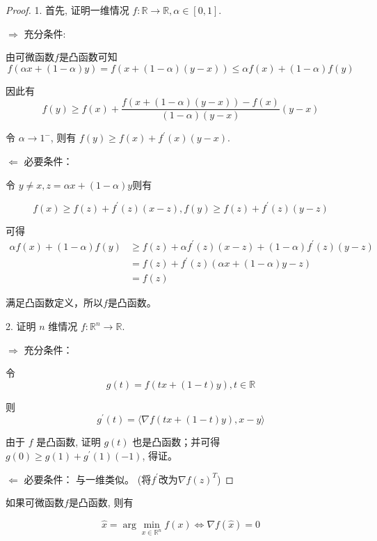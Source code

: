 \begin{proof}
    1. 首先, 证明一维情况 $ f: \mathbb{R} \rightarrow \mathbb{R}, \alpha \in[0,1] $.

    $ \Rightarrow  $ 充分条件: 
    
    由可微函数$f$是凸函数可知
    $$ f(\alpha x+(1-\alpha) y)=f(x+(1-\alpha)(y-x)) \leq \alpha f(x)+(1-\alpha) f(y) $$
    
    因此有
    $$ f(y) \geq f(x)+\frac{f(x+(1-\alpha)(y-x))-f(x)}{(1-\alpha)(y-x)}(y-x) $$

    令 $ \alpha \rightarrow 1^- $, 则有 $ f(y) \geq f(x)+f^{\prime}(x)(y-x) $.

    $ \Leftarrow  $ 必要条件：
    
    令 $ y \neq x, z=\alpha x+(1-\alpha) y$则有

    $$  f(x) \geq f(z)+f^{\prime}(z)(x-z), f(y) \geq f(z)+f^{\prime}(z)(y-z)  $$

    可得 
    $$\begin{aligned}
        \alpha f(x)+(1-\alpha) f(y) &\geq f(z)+\alpha f^{\prime}(z)(x-z)+(1-\alpha) f^{\prime}(z)(y-z) \\
        &=f(z)+f^{\prime}(z)(\alpha x+(1-\alpha) y-z) \\
        &=f(z)
    \end{aligned}
    $$

    满足凸函数定义，所以$f$是凸函数。

    2. 证明 $ n $ 维情况 $ f: \mathbb{R}^{n} \rightarrow \mathbb{R} $.

    $ \Rightarrow $ 充分条件：
    
    令 $$ g(t)=f(t x+(1-t) y), t \in \mathbb{R} $$

    则$$ g^{\prime}(t)=\langle\nabla f(t x+(1-t) y), x-y\rangle $$

    由于 $ f $ 是凸函数, 证明 $ g(t) $ 也是凸函数；并可得 $ g(0) \geq g(1)+g^{\prime}(1)(-1) $, 得证。

    $ \Leftarrow $ 必要条件：
    与一维类似。 (将$f^{\prime}$改为$\nabla f(z)^T$) 
\end{proof}

\begin{theorem}
    如果可微函数$f$是凸函数, 则有

    $$ \hat{x}=\arg \min _{x \in \mathbb{R}^{n}} f(x) \Leftrightarrow \nabla f(\hat{x})=0 $$
\end{theorem}

